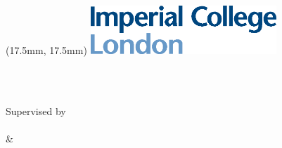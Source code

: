 \begin{titlepage}
	\begin{textblock*}{80mm}(17.5mm, 17.5mm)%
	  \includegraphics[width=7cm]{./Figures/imperial_logo}
	\end{textblock*}
    \begin{center}
        \large

        \hfill

        \vfill\vfill

        \begingroup
            \color{ImperialBlue}\spacedallcaps{\myTitleLineOne} \\\bigskip
        \endgroup

        \spacedlowsmallcaps{\myName}

        \vfill\vfill

        \textit{\myDegree} \\

        \vfill
        Supervised by \\ \spacedlowsmallcaps{\myProf} \\ \& \\ \spacedlowsmallcaps{\myOtherProf}\\
        \myUni \\ \bigskip

        \myTime\\

        \vfill

    \end{center}
\end{titlepage}
